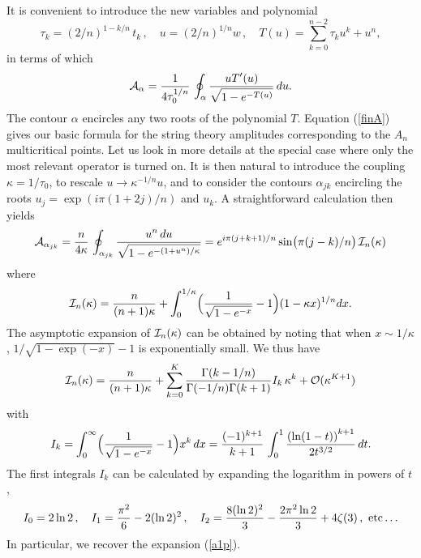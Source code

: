 \documentclass[a4paper,12pt]{article}
\begin{document}
{It is convenient to introduce the new variables and polynomial
%
\begin{equation}
\label{newvar}
\tau_{k} = (2/n)^{1-k/n}\, t_{k}\, ,\quad u= (2/n)^{1/n} w\, ,\quad
T(u) = \sum_{k=0}^{n-2}\tau_{k}u^{k} + u^{n} ,
\end{equation}
%
in terms of which
%
\begin{equation}
\label{finA}
{\cal A}_{\alpha} = {1\over 4\tau_{0}^{1/n}}\, \oint_{\alpha}
{\displaystyle u T'(u)\over\displaystyle\sqrt{1-e^{-T(u)}}}\, du .
\end{equation}
%
The contour $\alpha$ encircles any two roots of the polynomial $T$. Equation
(\ref{finA}) gives our basic formula for the string theory amplitudes 
corresponding to the $A_{n}$ multicritical points.
Let us look in more details at the special case where only the most 
relevant operator is turned on. It is then natural to introduce the 
coupling $\kappa = 1/\tau_{0}$, to rescale 
$u\rightarrow \kappa^{-1/n}u$, and to consider the contours $\alpha_{jk}$ 
encircling the roots
$u_{j}=\exp (i\pi (1 + 2j)/n)$ and $u_{k}$. A straightforward 
calculation then yields
%
\begin{equation}
\label{Ai1}
{\cal A}_{\alpha_{jk}} = {n\over 4\kappa}\,\oint_{\alpha_{jk}}
{\displaystyle u^{n}\, 
du\over\displaystyle\sqrt{1-e^{-(1+u^{n})/\kappa}}} =
e^{i\pi (j+k+1)/n}\sin\bigl(\pi(j-k)/n\bigr)\, {\cal I}_{n}(\kappa)
\end{equation}
%
where
%
\begin{equation}
\label{Indef}
{\cal I}_{n}(\kappa) = {n\over (n+1)\kappa} + \int_{0}^{1/\kappa}
\Bigl( {\displaystyle1\over\displaystyle\sqrt{1-e^{-x}}}-1 \Bigr) 
(1-\kappa x)^{1/n}dx.
\end{equation}
%
The asymptotic expansion of ${\cal I}_{n}(\kappa)$ can be obtained by 
noting that when $x\sim 1/\kappa$, $1/\sqrt{1-\exp(-x)} -1$ is 
exponentially small. We thus have
%
\begin{equation}
\label{Inas}
{\cal I}_{n}(\kappa) = {n\over (n+1)\kappa} + \sum_{k=0}^{K}
{\Gamma(k-1/n)\over\Gamma(-1/n)\Gamma(k+1)} I_{k}\, \kappa^{k} + {\cal 
O}(\kappa^{K+1})
\end{equation}
%
with
%
\begin{equation}
\label{Idef2}
I_{k} = \int_{0}^{\infty}\Bigl( {\displaystyle 1\over\displaystyle\sqrt{1
-e^{-x}}} - 1 \Bigr) x^{k}\, dx = {(-1)^{k+1}\over k+1}\,
\int_{0}^{1}{\left( \ln(1-t) \right)^{k+1}\over 2t^{3/2}}\, dt.
\end{equation}
The first integrals $I_{k}$ can be calculated by expanding the logarithm 
in powers of $t$,
%
\begin{equation}
\label{expik}
I_{0}=2\ln2\, ,\quad I_{1} = {\pi^{2}\over 6} - 2 (\ln 2)^{2}\, ,\quad
I_{2} = {8 (\ln 2)^{2}\over 3} - {2 \pi^{2}\ln 2\over 3} + 4 \zeta(3)\, ,
\ {\rm etc\ldots}
\end{equation}
%
In particular, we recover the expansion (\ref{a1p}).
%
}
\end{document}

